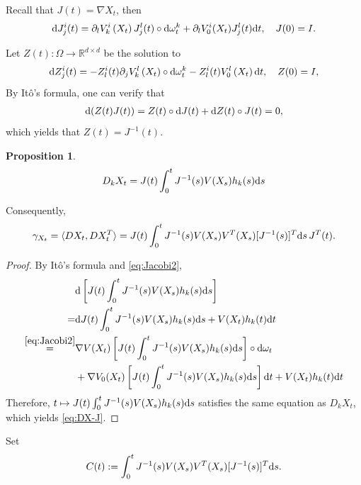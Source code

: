\documentclass[twoside, 12pt]{book}
\numberwithin{equation}{chapter}
\newtheorem{proposition}[theorem]{Proposition}
\def\l{\left}
\def\r{\right}
\def\<{\langle}
\def\>{\rangle}
\def\p{\partial}
\def\d{\text{\rm{d}}}
\begin{document}
    Recall that $J(t)= \nabla X_t$, then 
    \begin{equation}\label{eq:Jacobi2}
        \d J^i_j(t)=\p_l V^i_k \left(X_t\right) J^l_j(t) \circ \d \omega^k_t + \p_l V^i_0(X_t) J^l_j(t)\d t, \quad J(0)=I .
    \end{equation}
   
   Let $Z(t): \Omega \rightarrow \mathbb{R}^{d \times d}$ be the solution to
   \begin{equation}\label{eq:Inv-J}
   	    \d Z^i_j(t)=-Z^i_l(t)  \p_j V^l_k  \left(X_t\right) \circ \d \omega^k_t-Z^i_l (t) V^l_0 \left(X_t\right) \d t, \quad Z(0)=I,
   \end{equation}
    By Itô's formula, one can verify that 
    \begin{equation*}
    	\begin{aligned}
    		\d (Z(t)J(t))= Z(t) \circ \d J(t)+\d Z(t) \circ J(t)=0, 
    	\end{aligned}
    \end{equation*}
    which yields that $Z(t)=J^{-1}(t)$. 
    
    \begin{proposition}
    	\begin{equation}\label{eq:DX-J}
    		D_kX_t=J(t) \int_0^t J^{-1}(s) V(X_s) h_k(s) \d s
    	\end{equation}
    \end{proposition}
    Consequently, 
    \begin{equation}
    	\gamma_{X_t}=\< D X_t, D X^{T}_t\>=  J(t)  \int_0^t J^{-1}(s) V(X_s) V^{T}(X_s) [J^{-1}(s)]^{T} \d s \, J^T(t). 
    \end{equation}
    \begin{proof}
    	By It\^o's formula and \eqref{eq:Jacobi2}, 
    	\begin{align*}
    		&\d \l[ J(t) \int_0^t J^{-1}(s) V(X_s) h_k(s) \d s \r]\\
    	=&\d J(t)  \int_0^t J^{-1}(s) V(X_s) h_k(s) \d s + V(X_t) h_k(t) \d t \\
    	\overset{\eqref{eq:Jacobi2}}{=}& \nabla V(X_t) \l[J(t)\int_0^t J^{-1}(s) V(X_s) h_k(s) \d s \r]  \circ \d \omega_t \\
    	&+ \nabla V_0(X_t) \l[J(t)\int_0^t J^{-1}(s) V(X_s) h_k(s) \d s \r]  \d t + V(X_t) h_k(t) \d t 
    	\end{align*}
    	Therefore, $t\mapsto J(t) \int_0^t J^{-1}(s) V(X_s) h_k(s) \d s$ satisfies the same equation as $D_k X_t$, which yields \eqref{eq:DX-J}. 
    \end{proof}
    Set 
    \[
        C(t):= \int_0^t J^{-1}(s) V(X_s) V^{T}(X_s) [J^{-1}(s)]^{T} \d s. 
    \]
   
\end{document}
